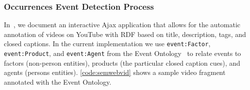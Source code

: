 \documentclass[runningheads,a4paper]{llncs}
\begin{document}

\subsubsection{Occurrences Event Detection Process}
In~\cite{semwebvid}, we document an interactive Ajax application that allows for the automatic annotation of videos on YouTube with RDF based on title, description, tags, and closed captions. In the current implementation we use \texttt{event:Factor}, \texttt{event:Product}, and \texttt{event:Agent} from the Event Ontology~\cite{Raimond:Event} to relate events to factors (non-person entities), products (the particular closed caption cues), and agents (persons entities). \autoref{code:semwebvid} shows a sample video fragment annotated with the Event Ontology.
\end{document}
